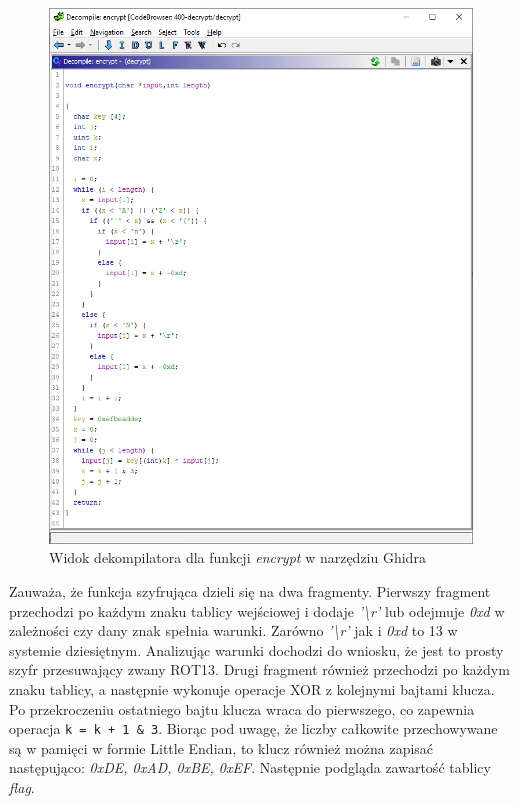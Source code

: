 \documentclass[polish,12pt]{aghthesis}
\begin{document}
\begin{figure}[H]
    \centering
    \includegraphics[width=14cm]{400_encrypt}
    \caption{Widok dekompilatora dla funkcji \emph{encrypt} w narzędziu Ghidra}
    \label{fig:400_encrypt}
\end{figure}

Zauważa, że funkcja szyfrująca dzieli się na dwa fragmenty.
Pierwszy fragment przechodzi po każdym znaku tablicy wejściowej i dodaje
\emph{'\textbackslash r'} lub
odejmuje \emph{0xd} w zależności czy dany znak spełnia warunki.
Zarówno \emph{'\textbackslash r'} jak i \emph{0xd} to 13 w systemie dziesiętnym.
Analizując warunki dochodzi do wniosku, że jest to prosty szyfr przesuwający zwany ROT13.
Drugi fragment również przechodzi po każdym znaku tablicy, a następnie wykonuje
operacje XOR z kolejnymi bajtami klucza. Po przekroczeniu ostatniego bajtu klucza
wraca do pierwszego, co zapewnia operacja \texttt{k = k + 1 & 3}.
Biorąc pod uwagę, że liczby całkowite przechowywane
są w pamięci w formie Little Endian, to klucz również można zapisać następująco:
\emph{0xDE, 0xAD, 0xBE, 0xEF}. Następnie podgląda zawartość tablicy \emph{flag}.
\end{document}
